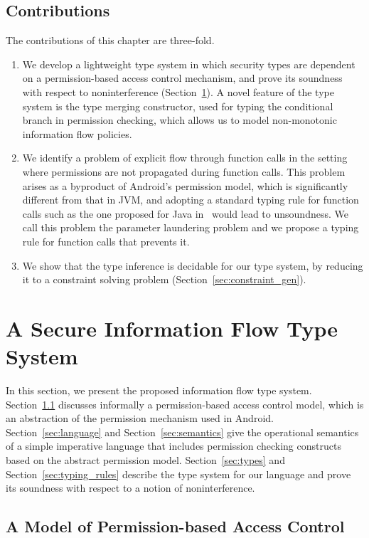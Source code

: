 \subsection{Contributions}
The contributions of this chapter are three-fold.
\begin{enumerate}\item We develop a lightweight type system in which security types are dependent on a permission-based access control mechanism, and prove its soundness with respect to noninterference (Section~\ref{sec:type_system}). A novel feature of the type system is the type merging constructor, used for typing the conditional branch in permission checking, which allows us to model non-monotonic information flow policies.
	\item We identify a problem of explicit flow through function calls in the setting where permissions are not propagated during function calls. This problem
	arises as a byproduct of Android's permission model, which is significantly different from that in JVM, and adopting a standard typing rule for function calls such as the one proposed for Java in~\cite{Banerjee:2005ht} 
	would lead to unsoundness. We call this problem the parameter laundering problem and we propose a typing rule for function calls that prevents it.
	\item We show that the type inference is decidable for our type system, by reducing it to a constraint solving problem (Section~\ref{sec:constraint_gen}).
\end{enumerate}
 \section{A Secure Information Flow Type System}\label{sec:type_system}

In this section, we present the proposed information flow type system. Section~\ref{sec:permission_model} discusses informally a permission-based access control model, which is an abstraction of the permission mechanism used in Android.
Section~\ref{sec:language} and Section~\ref{sec:semantics} give the operational semantics of a simple imperative language that includes permission checking
constructs based on the abstract permission model.
Section~\ref{sec:types} and Section~\ref{sec:typing_rules} describe the type system for our language and prove its soundness with respect to a notion of noninterference.

\subsection{A Model of Permission-based Access Control}
\label{sec:permission_model}

